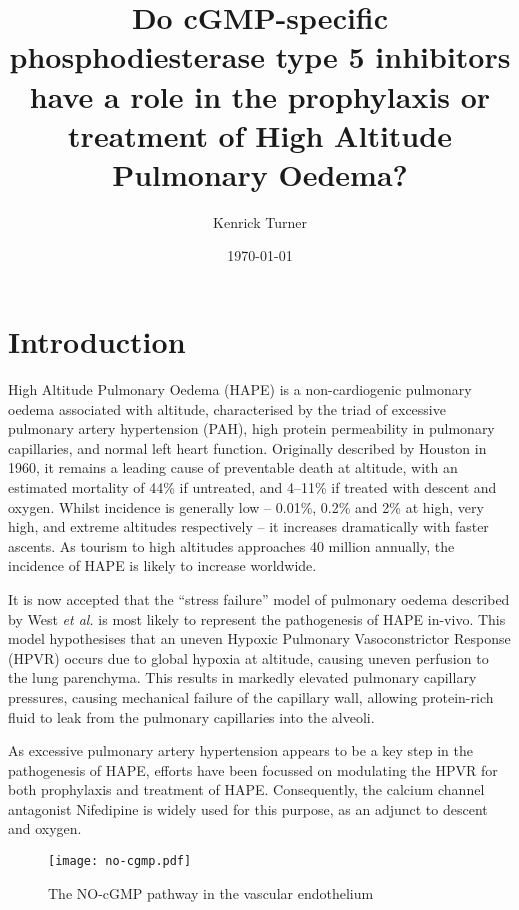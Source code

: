 \documentclass[10pt,a4paper]{article}
\title{Do cGMP-specific phosphodiesterase type 5 inhibitors have a role in the prophylaxis or treatment of High Altitude Pulmonary Oedema?}
\author{Kenrick Turner}
\date{\today}
\begin{document}
\maketitle


\section*{Introduction}


High Altitude Pulmonary Oedema (HAPE) is a non-cardiogenic pulmonary oedema associated with altitude, characterised by the triad of excessive pulmonary artery hypertension (PAH), high protein permeability in pulmonary capillaries, and normal left heart function.\cite{Fred:1962hy,Roy:1969tt,Schoene:1988tz} Originally described by Houston in 1960, it remains a leading cause of preventable death at altitude, with an estimated mortality of 44\% if untreated, and 4--11\% if treated with descent and oxygen.\cite{HOUSTON:1960gz,Lobenhoffer:1982eg,MENON:1965gk} Whilst incidence is generally low -- 0.01\%, 0.2\% and 2\% at high, very high, and extreme altitudes respectively -- it increases dramatically with faster ascents.\cite{Bartsch:2002cg} As tourism to high altitudes approaches 40 million annually, the incidence of HAPE is likely to increase worldwide.\cite{West:ug}

It is now accepted that the ``stress failure'' model of pulmonary oedema described by West \emph{et al.} is most likely to represent the pathogenesis of HAPE in-vivo.\cite{Maggiorini:2001vq} This model hypothesises that an uneven Hypoxic Pulmonary Vasoconstrictor Response (HPVR) occurs due to global hypoxia at altitude, causing uneven perfusion to the lung parenchyma. This results in markedly elevated pulmonary capillary pressures, causing mechanical failure of the capillary wall, allowing protein-rich fluid to leak from the pulmonary capillaries into the alveoli.\cite{West:1991vc,West:1995tg}

As excessive pulmonary artery hypertension appears to be a key step in the pathogenesis of HAPE,\cite{Maggiorini:2001vq,Swenson:2002ub} efforts have been focussed on modulating the HPVR for both prophylaxis and treatment of HAPE. Consequently, the calcium channel antagonist Nifedipine is widely used for this purpose, as an adjunct to descent and oxygen.\cite{Luks:2010ht}

\begin{figure}[!hb]
\centering
\texttt{[image: no-cgmp.pdf]}
\caption{The NO-cGMP pathway in the vascular endothelium\cite{Archer:2009cx}}
\label{fig:no-cgmp_pathway}
\end{figure}
\end{document}
